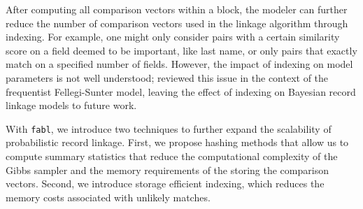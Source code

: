 \documentclass[ba]{imsart}
\begin{document}
After computing all comparison vectors within a block, the modeler can further reduce the number of comparison vectors used in the linkage algorithm through indexing. For example, one might only consider pairs with a certain similarity score on a field deemed to be important, like last name, or only pairs that exactly match on a specified number of fields. However, the impact of indexing on model parameters is not well understood; \citep{murray2016probabilistic} reviewed this issue in the context of the frequentist Fellegi-Sunter model, leaving the effect of indexing on Bayesian record linkage models to future work.

With \texttt{fabl}, we introduce two techniques to further expand the scalability of probabilistic record linkage. First, we propose hashing methods that allow us to compute summary statistics that reduce the computational complexity of the Gibbs sampler and the memory requirements of the storing the comparison vectors. Second, we introduce storage efficient indexing, which reduces the memory costs associated with unlikely matches. 

%
\end{document}
